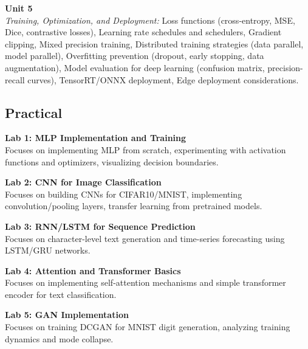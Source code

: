 \vspace{0.3cm}

\noindent\textbf{Unit 5} \\
\textit{Training, Optimization, and Deployment:} Loss functions (cross-entropy, MSE, Dice, contrastive losses), Learning rate schedules and schedulers, Gradient clipping, Mixed precision training, Distributed training strategies (data parallel, model parallel), Overfitting prevention (dropout, early stopping, data augmentation), Model evaluation for deep learning (confusion matrix, precision-recall curves), TensorRT/ONNX deployment, Edge deployment considerations.

\newpage

\subsection*{Practical}
\noindent\textbf{Lab 1: MLP Implementation and Training} \\
Focuses on implementing MLP from scratch, experimenting with activation functions and optimizers, visualizing decision boundaries.

\vspace{0.2cm}

\noindent\textbf{Lab 2: CNN for Image Classification} \\
Focuses on building CNNs for CIFAR10/MNIST, implementing convolution/pooling layers, transfer learning from pretrained models.

\vspace{0.2cm}

\noindent\textbf{Lab 3: RNN/LSTM for Sequence Prediction} \\
Focuses on character-level text generation and time-series forecasting using LSTM/GRU networks.

\vspace{0.2cm}

\noindent\textbf{Lab 4: Attention and Transformer Basics} \\
Focuses on implementing self-attention mechanisms and simple transformer encoder for text classification.

\vspace{0.2cm}

\noindent\textbf{Lab 5: GAN Implementation} \\
Focuses on training DCGAN for MNIST digit generation, analyzing training dynamics and mode collapse.

\vspace{0.2cm}

